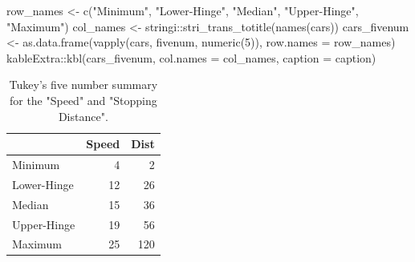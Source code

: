 \documentclass[
]{article}
\newenvironment{Shaded}{\begin{snugshade}}{\end{snugshade}}
\newcommand{\AttributeTok}[1]{\textcolor[rgb]{0.77,0.63,0.00}{#1}}
\newcommand{\DecValTok}[1]{\textcolor[rgb]{0.00,0.00,0.81}{#1}}
\newcommand{\FunctionTok}[1]{\textcolor[rgb]{0.00,0.00,0.00}{#1}}
\newcommand{\NormalTok}[1]{#1}
\newcommand{\OtherTok}[1]{\textcolor[rgb]{0.56,0.35,0.01}{#1}}
\newcommand{\SpecialCharTok}[1]{\textcolor[rgb]{0.00,0.00,0.00}{#1}}
\newcommand{\StringTok}[1]{\textcolor[rgb]{0.31,0.60,0.02}{#1}}
\begin{document}
\begin{Shaded}
\begin{Highlighting}[]
\NormalTok{row\_names }\OtherTok{\textless{}{-}} \FunctionTok{c}\NormalTok{(}\StringTok{"Minimum"}\NormalTok{, }\StringTok{"Lower{-}Hinge"}\NormalTok{, }\StringTok{"Median"}\NormalTok{, }\StringTok{"Upper{-}Hinge"}\NormalTok{, }\StringTok{"Maximum"}\NormalTok{)}
\NormalTok{col\_names }\OtherTok{\textless{}{-}}\NormalTok{ stringi}\SpecialCharTok{::}\FunctionTok{stri\_trans\_totitle}\NormalTok{(}\FunctionTok{names}\NormalTok{(cars))}
\NormalTok{cars\_fivenum }\OtherTok{\textless{}{-}} \FunctionTok{as.data.frame}\NormalTok{(}\FunctionTok{vapply}\NormalTok{(cars, fivenum, }\FunctionTok{numeric}\NormalTok{(}\DecValTok{5}\NormalTok{)), }
                              \AttributeTok{row.names =}\NormalTok{ row\_names)}
\NormalTok{kableExtra}\SpecialCharTok{::}\FunctionTok{kbl}\NormalTok{(cars\_fivenum, }\AttributeTok{col.names =}\NormalTok{ col\_names,}
                \AttributeTok{caption =}\NormalTok{ caption)}
\end{Highlighting}
\end{Shaded}

\begin{table}

\caption{\label{tab:cars-fivenum}Tukey's five number summary for the "Speed" and "Stopping Distance".}
\centering
\begin{tabular}[t]{l|r|r}
\hline
  & Speed & Dist\\
\hline
Minimum & 4 & 2\\
\hline
Lower-Hinge & 12 & 26\\
\hline
Median & 15 & 36\\
\hline
Upper-Hinge & 19 & 56\\
\hline
Maximum & 25 & 120\\
\hline
\end{tabular}
\end{table}
\end{document}
